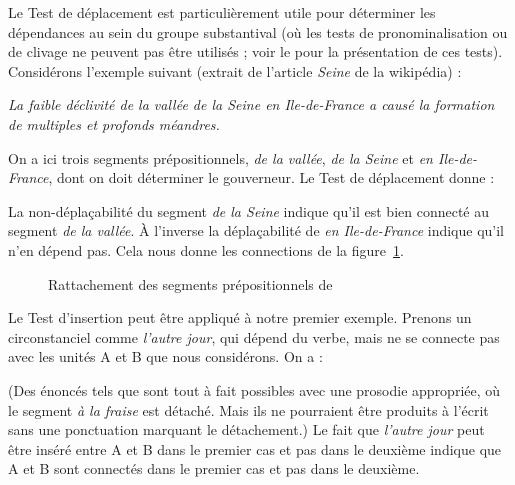 Le Test de déplacement est particulièrement utile pour déterminer les dépendances au sein du groupe substantival (où les tests de pronominalisation ou de clivage ne peuvent pas être utilisés ; voir le  pour la présentation de ces tests). Considérons l’exemple suivant (extrait de l’article \textit{Seine} de la wikipédia) :

\ea \textit{La faible déclivité de la vallée de la Seine en Ile-de-France a causé la formation de multiples et profonds méandres.}
\label{ex:Seine}\z

On a ici trois segments prépositionnels, \textit{de la vallée}, \textit{de la Seine} et \textit{en Ile-de-France}, dont on doit déterminer le gouverneur. Le Test de déplacement donne :

\ea
  \z
\z
La non-déplaçabilité du segment \textit{de la Seine} indique qu’il est bien connecté au segment \textit{de la vallée}. À l’inverse la déplaçabilité de \textit{en Ile-de-France} indique qu’il n’en dépend pas. Cela nous donne les connections de la figure~\ref{fig:Seine}.

\begin{figure}
\small{}
\caption{Rattachement des segments prépositionnels de \label{fig:Seine}}
\end{figure}

Le Test d’insertion peut être appliqué à notre premier exemple. Prenons un circonstanciel comme \textit{l’autre jour}, qui dépend du verbe, mais ne se connecte pas avec les unités A et B que nous considérons. On a :

\ea\label{ex:insertion-glace}
  \z
\z
(Des énoncés tels que  sont tout à fait possibles avec une prosodie appropriée, où le segment \textit{à la fraise} est détaché. Mais ils ne pourraient être produits à l’écrit sans une ponctuation marquant le détachement.) Le fait que \textit{l’autre jour} peut être inséré entre A et B dans le premier cas et pas dans le deuxième indique que A et B sont connectés dans le premier cas et pas dans le deuxième.

